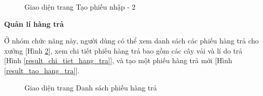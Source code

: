 \begin{figure}[H]
    \begin{center}
        \caption{Giao diện trang Tạo phiếu nhập - 2}
        \label{result_tao_phieu_nhap_2}
    \end{center}
\end{figure}

\textbf{Quản lí hàng trả}

Ở nhóm chức năng này, người dùng có thể xem danh sách các phiếu hàng trả cho xưởng [Hình \ref{result_danh_sach_hang_tra}], xem chi tiết phiếu hàng trả bao gồm các cây vải và lí do trả [Hình \ref{result_chi_tiet_hang_tra}], và tạo một phiếu hàng trả mới [Hình \ref{result_tao_hang_tra}].

\begin{figure}[H]
    \begin{center}
        \caption{Giao diện trang Danh sách phiếu hàng trả}
        \label{result_danh_sach_hang_tra}
    \end{center}
\end{figure}

